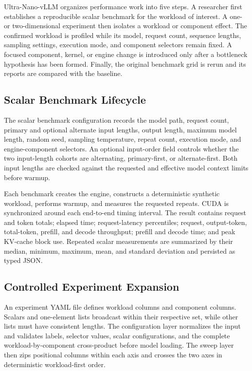\documentclass[conference]{IEEEtran}
\begin{document}
Ultra-Nano-vLLM organizes performance work into five steps. A researcher first
establishes a reproducible scalar benchmark for the workload of interest. A
one- or two-dimensional experiment then isolates a workload or component
effect. The confirmed workload is profiled while its model, request count,
sequence lengths, sampling settings, execution mode, and component selectors
remain fixed. A focused component, kernel, or engine change is introduced only
after a bottleneck hypothesis has been formed. Finally, the original benchmark
grid is rerun and its reports are compared with the baseline.

\subsection{Scalar Benchmark Lifecycle}

The scalar benchmark configuration records the model path, request count,
primary and optional alternate input lengths, output length, maximum model
length, random seed, sampling temperature, repeat count, execution mode, and
engine-component selectors. An optional input-order field controls whether the
two input-length cohorts are alternating, primary-first, or alternate-first.
Both input lengths are checked against the requested and effective model
context limits before warmup.

Each benchmark creates the engine, constructs a deterministic synthetic
workload, performs warmup, and measures the requested repeats. CUDA is
synchronized around each end-to-end timing interval. The result contains
request and token totals; elapsed time; request-latency percentiles; request,
output-token, total-token, prefill, and decode throughput; prefill and decode
time; and peak KV-cache block use. Repeated scalar measurements are summarized
by their median, minimum, maximum, mean, and standard deviation and persisted
as typed JSON.

\subsection{Controlled Experiment Expansion}

An experiment YAML file defines workload columns and component columns.
Scalars and one-element lists broadcast within their respective set, while
other lists must have consistent lengths. The configuration layer normalizes
the input and validates labels, selector values, scalar configurations, and
the complete workload-by-component cross-product before model loading. The
sweep layer then zips positional columns within each axis and crosses the two
axes in deterministic workload-first order.
\end{document}
